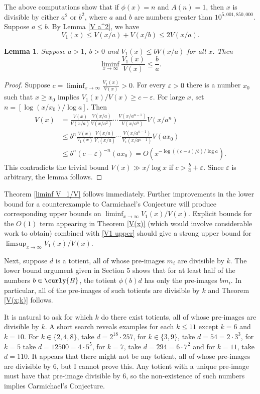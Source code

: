 \documentclass[11pt]{amsart}
\theoremstyle{remark}
\theoremstyle{plain}
\newtheorem{lem}{Lemma}[section]
\numberwithin{equation}{section}
\newcommand{\be}{\begin{equation}}
\newcommand{\ee}{\end{equation}}
\newcommand{\e}{\ensuremath{\varepsilon}}
\renewcommand{\(}{\left(}
\renewcommand{\)}{\right)}
\newcommand{\fancyB}{{\curly{B}}}
\renewcommand{\le}{\leqslant}
\renewcommand{\ge}{\geqslant}
\begin{document}
The above computations show that if $\phi(x)=n$ and $A(n)=1$,
then $x$ is
divisible by either $a^2$ or $b^2$, where $a$ and $b$ are
numbers greater than $10^{5,001,850,000}$.
Suppose $a\le b$. By Lemma \ref{V a^2}, we have
\be\label{V1 upper}
V_1(x) \le V(x/a) + V(x/b) \le 2V(x/a).
\ee

\begin{lem} \label{liminf}  Suppose $a>1$, $b>0$ and
$V_1(x) \le b V(x/a)$ for all $x$.  Then
$$
\liminf_{x\to\infty} \frac{V_1(x)}{V(x)} \le \frac{b}{a}.
$$
\end{lem}

\begin{proof}
Suppose
$c = \liminf_{x\to\infty} \frac{V_1(x)}{V(x)}>0$.
For every $\e>0$ there is a number $x_0$ such that $x\ge x_0$ implies
$V_1(x)/V(x) \ge c-\e$.  For large $x$, set $n=[\log(x/x_0)/\log a]$.
Then
\begin{align*}
V(x) &= \frac{V(x)}{V(x/a)} \frac{V(x/a)}{V(x/a^2)} \cdots \frac{V(x/a^{n-1})}
{V(x/a^n)} V(x/a^n) \\
&\le b^n \frac{V(x)}{V_1(x)} \frac{V(x/a)}{V_1(x/a)} \cdots \frac{V(x/a^{n-1})}
{V_1(x/a^{n-1})} V(ax_0) \\
&\le b^n(c-\e)^{-n} (ax_0) = O(x^{-\log((c-\e)/b)/\log a}).
\end{align*}
This contradicts the trivial bound $V(x)\gg x/\log x$ if $c>\frac{b}{a}+\e$.
Since $\e$ is arbitrary, the lemma follows.
\end{proof}

Theorem \ref{liminf V_1/V} follows immediately.
Further improvements in the lower bound for a counterexample to Carmichael's
Conjecture will produce corresponding upper bounds on $\liminf_{x\to \infty}
V_1(x)/V(x)$.
Explicit bounds for the $O(1)$ term appearing in Theorem \ref{V(x)}
(which would involve considerable work to obtain) combined with
\eqref{V1 upper} should give  a strong upper bound for
$\limsup_{x\to \infty} V_1(x)/V(x)$.

Next, suppose $d$ is a totient, all of whose
pre-images $m_i$ are divisible by $k$.
The lower bound argument given in Section
5 shows that for at least half of the numbers $b\in \fancyB$, the totient
$\phi(b)d$ has only the pre-images $bm_i$.  In particular, all of the
pre-images of such totients are divisible by $k$ and Theorem \ref{V(x;k)}
follows.

It is natural to ask for which $k$ do there exist totients, all
of whose pre-images are divisible by $k$.
A short search reveals examples for each $k\le 11$ except $k=6$ and $k=10$.
For $k\in\{2,4,8\}$, take $d=2^{18} \cdot 257$, for $k\in\{3,9\}$, take
$d=54=2\cdot 3^3$,
for $k=5$ take $d=12500=4\cdot 5^5$, for $k=7$, take $d=294=6\cdot 7^2$
and for $k=11$, take $d=110$.  It appears that there might not be any
totient, all of whose pre-images are divisible by 6, but I cannot prove this.
Any totient with a unique pre-image must have that pre-image
divisible by 6, so the non-existence of such numbers
implies Carmichael's Conjecture.
\end{document}
